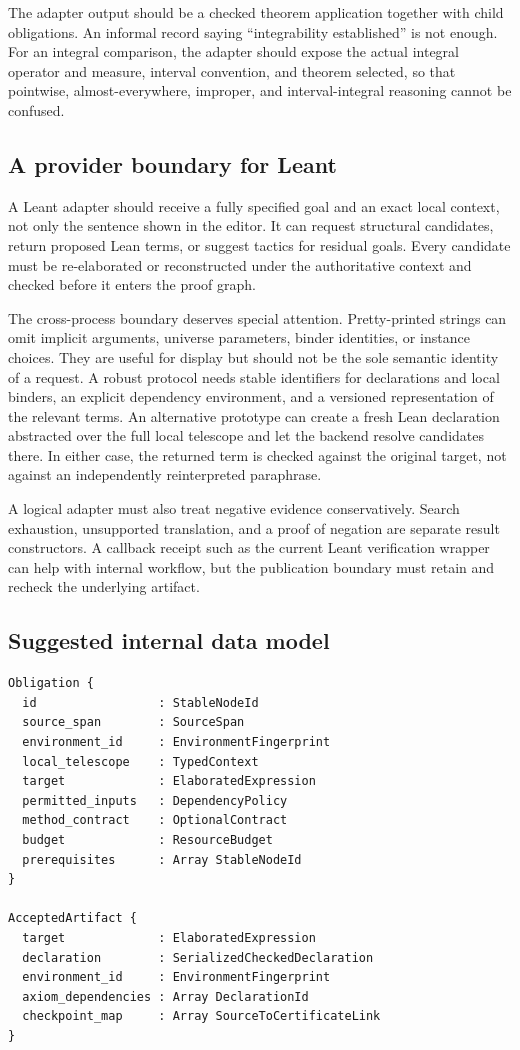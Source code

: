 \documentclass[11pt,a4paper]{article}
\theoremstyle{definition}
\theoremstyle{remark}
\begin{document}
The adapter output should be a checked theorem application together with child obligations. An informal record saying ``integrability established'' is not enough. For an integral comparison, the adapter should expose the actual integral operator and measure, interval convention, and theorem selected, so that pointwise, almost-everywhere, improper, and interval-integral reasoning cannot be confused.

\subsection{A provider boundary for Leant}
A Leant adapter should receive a fully specified goal and an exact local context, not only the sentence shown in the editor. It can request structural candidates, return proposed Lean terms, or suggest tactics for residual goals. Every candidate must be re-elaborated or reconstructed under the authoritative context and checked before it enters the proof graph.

The cross-process boundary deserves special attention. Pretty-printed strings can omit implicit arguments, universe parameters, binder identities, or instance choices. They are useful for display but should not be the sole semantic identity of a request. A robust protocol needs stable identifiers for declarations and local binders, an explicit dependency environment, and a versioned representation of the relevant terms. An alternative prototype can create a fresh Lean declaration abstracted over the full local telescope and let the backend resolve candidates there. In either case, the returned term is checked against the original target, not against an independently reinterpreted paraphrase.

A logical adapter must also treat negative evidence conservatively. Search exhaustion, unsupported translation, and a proof of negation are separate result constructors. A callback receipt such as the current Leant verification wrapper can help with internal workflow, but the publication boundary must retain and recheck the underlying artifact.

\subsection{Suggested internal data model}
\begin{lstlisting}
Obligation {
  id                 : StableNodeId
  source_span        : SourceSpan
  environment_id     : EnvironmentFingerprint
  local_telescope    : TypedContext
  target             : ElaboratedExpression
  permitted_inputs   : DependencyPolicy
  method_contract    : OptionalContract
  budget             : ResourceBudget
  prerequisites      : Array StableNodeId
}

AcceptedArtifact {
  target             : ElaboratedExpression
  declaration        : SerializedCheckedDeclaration
  environment_id     : EnvironmentFingerprint
  axiom_dependencies : Array DeclarationId
  checkpoint_map     : Array SourceToCertificateLink
}
\end{lstlisting}
\end{document}
